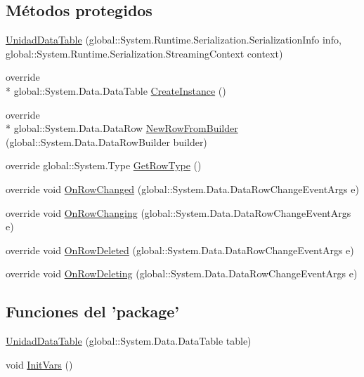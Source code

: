 \subsection*{Métodos protegidos}
\begin{DoxyCompactItemize}
\item 
\hyperlink{class_proyecto___integrador__3_1_1ds_unidad_1_1_unidad_data_table_ae44fcd610b2137bf037993461dc807e1}{Unidad\-Data\-Table} (global\-::\-System.\-Runtime.\-Serialization.\-Serialization\-Info info, global\-::\-System.\-Runtime.\-Serialization.\-Streaming\-Context context)
\item 
override \\*
global\-::\-System.\-Data.\-Data\-Table \hyperlink{class_proyecto___integrador__3_1_1ds_unidad_1_1_unidad_data_table_a391e6d40aac8d3003aa578efef7dd60f}{Create\-Instance} ()
\item 
override \\*
global\-::\-System.\-Data.\-Data\-Row \hyperlink{class_proyecto___integrador__3_1_1ds_unidad_1_1_unidad_data_table_a8bf2297564b2fd02cdb44f1b0931f108}{New\-Row\-From\-Builder} (global\-::\-System.\-Data.\-Data\-Row\-Builder builder)
\item 
override global\-::\-System.\-Type \hyperlink{class_proyecto___integrador__3_1_1ds_unidad_1_1_unidad_data_table_a2702138d35bac4fb8f377c714f63d586}{Get\-Row\-Type} ()
\item 
override void \hyperlink{class_proyecto___integrador__3_1_1ds_unidad_1_1_unidad_data_table_a4f268652ea96dfa54fbdd33f8a90fdb4}{On\-Row\-Changed} (global\-::\-System.\-Data.\-Data\-Row\-Change\-Event\-Args e)
\item 
override void \hyperlink{class_proyecto___integrador__3_1_1ds_unidad_1_1_unidad_data_table_a91f721a827b684ca26b6c9a59cd9b369}{On\-Row\-Changing} (global\-::\-System.\-Data.\-Data\-Row\-Change\-Event\-Args e)
\item 
override void \hyperlink{class_proyecto___integrador__3_1_1ds_unidad_1_1_unidad_data_table_a38a749a78c4f00a7400c9ef86af5359a}{On\-Row\-Deleted} (global\-::\-System.\-Data.\-Data\-Row\-Change\-Event\-Args e)
\item 
override void \hyperlink{class_proyecto___integrador__3_1_1ds_unidad_1_1_unidad_data_table_afc053b42fa474cf97536772bb8d2fecf}{On\-Row\-Deleting} (global\-::\-System.\-Data.\-Data\-Row\-Change\-Event\-Args e)
\end{DoxyCompactItemize}
\subsection*{Funciones del 'package'}
\begin{DoxyCompactItemize}
\item 
\hyperlink{class_proyecto___integrador__3_1_1ds_unidad_1_1_unidad_data_table_add5c85c666375a64bed68042b9c57eac}{Unidad\-Data\-Table} (global\-::\-System.\-Data.\-Data\-Table table)
\item 
void \hyperlink{class_proyecto___integrador__3_1_1ds_unidad_1_1_unidad_data_table_a3cc574830a44756b962dca4cf411e980}{Init\-Vars} ()
\end{DoxyCompactItemize}
